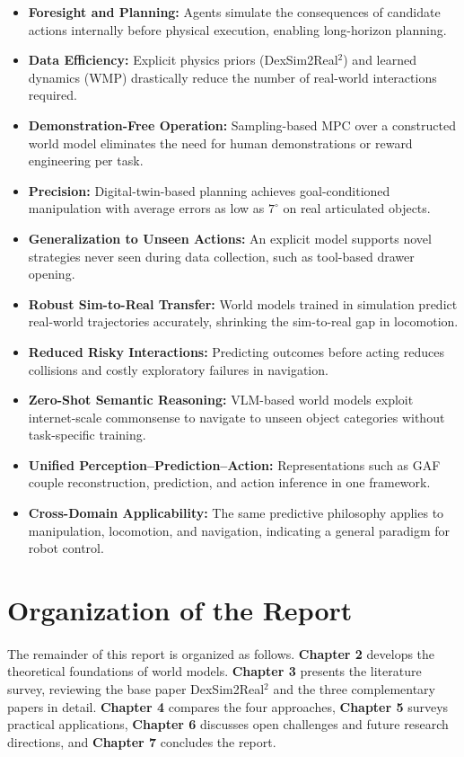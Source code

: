 \documentclass[12pt,a4paper,final]{extreport}
\begin{document}
\begin{itemize}
  \item \textbf{Foresight and Planning:} Agents simulate the consequences of candidate actions internally before physical execution, enabling long-horizon planning.
  \item \textbf{Data Efficiency:} Explicit physics priors (DexSim2Real$^2$) and learned dynamics (WMP) drastically reduce the number of real-world interactions required.
  \item \textbf{Demonstration-Free Operation:} Sampling-based MPC over a constructed world model eliminates the need for human demonstrations or reward engineering per task.
  \item \textbf{Precision:} Digital-twin-based planning achieves goal-conditioned manipulation with average errors as low as $7^{\circ}$ on real articulated objects.
  \item \textbf{Generalization to Unseen Actions:} An explicit model supports novel strategies never seen during data collection, such as tool-based drawer opening.
  \item \textbf{Robust Sim-to-Real Transfer:} World models trained in simulation predict real-world trajectories accurately, shrinking the sim-to-real gap in locomotion.
  \item \textbf{Reduced Risky Interactions:} Predicting outcomes before acting reduces collisions and costly exploratory failures in navigation.
  \item \textbf{Zero-Shot Semantic Reasoning:} VLM-based world models exploit internet-scale commonsense to navigate to unseen object categories without task-specific training.
  \item \textbf{Unified Perception--Prediction--Action:} Representations such as GAF couple reconstruction, prediction, and action inference in one framework.
  \item \textbf{Cross-Domain Applicability:} The same predictive philosophy applies to manipulation, locomotion, and navigation, indicating a general paradigm for robot control.
\end{itemize}

\section{Organization of the Report}

\paragraph{} The remainder of this report is organized as follows. \textbf{Chapter 2} develops the theoretical foundations of world models. \textbf{Chapter 3} presents the literature survey, reviewing the base paper DexSim2Real$^2$ and the three complementary papers in detail. \textbf{Chapter 4} compares the four approaches, \textbf{Chapter 5} surveys practical applications, \textbf{Chapter 6} discusses open challenges and future research directions, and \textbf{Chapter 7} concludes the report.
\end{document}
